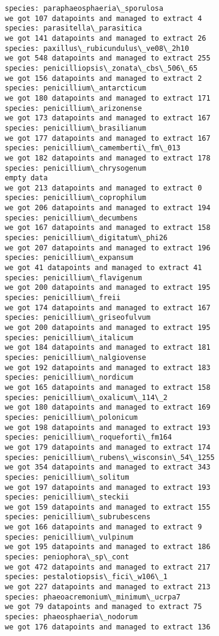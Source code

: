 \documentclass[11pt]{article}
\begin{document}
\begin{Verbatim}[commandchars=\\\{\}]
species: paraphaeosphaeria\_sporulosa
we got 107 datapoints and managed to extract 4
species: parasitella\_parasitica
we got 141 datapoints and managed to extract 26
species: paxillus\_rubicundulus\_ve08\_2h10
we got 548 datapoints and managed to extract 255
species: penicilliopsis\_zonata\_cbs\_506\_65
we got 156 datapoints and managed to extract 2
species: penicillium\_antarcticum
we got 180 datapoints and managed to extract 171
species: penicillium\_arizonense
we got 173 datapoints and managed to extract 167
species: penicillium\_brasilianum
we got 177 datapoints and managed to extract 167
species: penicillium\_camemberti\_fm\_013
we got 182 datapoints and managed to extract 178
species: penicillium\_chrysogenum
empty data
we got 213 datapoints and managed to extract 0
species: penicillium\_coprophilum
we got 206 datapoints and managed to extract 194
species: penicillium\_decumbens
we got 167 datapoints and managed to extract 158
species: penicillium\_digitatum\_phi26
we got 207 datapoints and managed to extract 196
species: penicillium\_expansum
we got 41 datapoints and managed to extract 41
species: penicillium\_flavigenum
we got 200 datapoints and managed to extract 195
species: penicillium\_freii
we got 174 datapoints and managed to extract 167
species: penicillium\_griseofulvum
we got 200 datapoints and managed to extract 195
species: penicillium\_italicum
we got 184 datapoints and managed to extract 181
species: penicillium\_nalgiovense
we got 192 datapoints and managed to extract 183
species: penicillium\_nordicum
we got 165 datapoints and managed to extract 158
species: penicillium\_oxalicum\_114\_2
we got 180 datapoints and managed to extract 169
species: penicillium\_polonicum
we got 198 datapoints and managed to extract 193
species: penicillium\_roqueforti\_fm164
we got 179 datapoints and managed to extract 174
species: penicillium\_rubens\_wisconsin\_54\_1255
we got 354 datapoints and managed to extract 343
species: penicillium\_solitum
we got 197 datapoints and managed to extract 193
species: penicillium\_steckii
we got 159 datapoints and managed to extract 155
species: penicillium\_subrubescens
we got 166 datapoints and managed to extract 9
species: penicillium\_vulpinum
we got 195 datapoints and managed to extract 186
species: peniophora\_sp\_cont
we got 472 datapoints and managed to extract 217
species: pestalotiopsis\_fici\_w106\_1
we got 227 datapoints and managed to extract 213
species: phaeoacremonium\_minimum\_ucrpa7
we got 79 datapoints and managed to extract 75
species: phaeosphaeria\_nodorum
we got 176 datapoints and managed to extract 136

\end{Verbatim}
\end{document}
